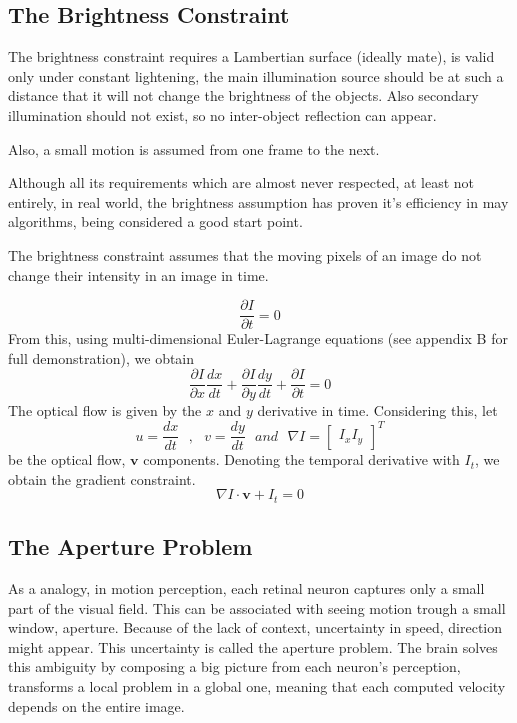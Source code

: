 \documentclass[12pt,a4paper,twoside]{report}
\begin{document}
\subsection{The Brightness Constraint} \label{BrightnessConstr}

The brightness constraint requires a Lambertian surface (ideally mate), is valid only under constant lightening, the main illumination source should be at such a distance that it will not change the brightness of the objects. Also secondary illumination should not exist, so no inter-object reflection can appear.

 Also, a small motion is assumed from one frame to the next. 
 
Although all its  requirements which are almost never respected, at least not entirely, in real world, the brightness assumption has proven it's efficiency in may algorithms, being considered a good start point.

The brightness constraint assumes that the moving pixels of an image do not change their intensity in an image in time.


\begin{equation}  \label{Idt0}
\frac{\partial I}{\partial t} = 0
\end{equation}
From this, using multi-dimensional Euler-Lagrange equations (see appendix B for full demonstration), we obtain
\begin{equation} \label{Idt0_lagr}
\frac{\partial I}{\partial x}\frac{dx}{dt} +
\frac{\partial I}{\partial y}\frac{dy}{dt} +
\frac{\partial I}{\partial t} = 0
\end{equation}
The optical flow is given by the $x$ and $y$ derivative in time. Considering this, let
\begin{equation}
u = \frac{dx}{dt} \ \ \ , \ \ \  v = \frac{dy}{dt} \ \ \ and \ \ \ \nabla I=\begin{bmatrix}
I_x I_y
\end{bmatrix} ^T
\end{equation} 
be the optical flow, $\boldsymbol{v}$ components. Denoting the temporal derivative with $I_t$, we obtain the gradient constraint. 
\begin{equation}
	\nabla I \cdot \boldsymbol{v}+I_t = 0
\end{equation}


\subsection{The Aperture Problem}
As a analogy, in motion perception, each retinal neuron captures only a small part of the visual field. This can be associated with seeing motion trough a small window, aperture. Because of the lack of context, uncertainty in speed, direction might appear. This uncertainty is called the aperture problem.
The brain solves this ambiguity by composing a big picture from each neuron's perception, transforms a local problem in a global one, meaning that each computed velocity depends on the entire image.
 
\end{document}
